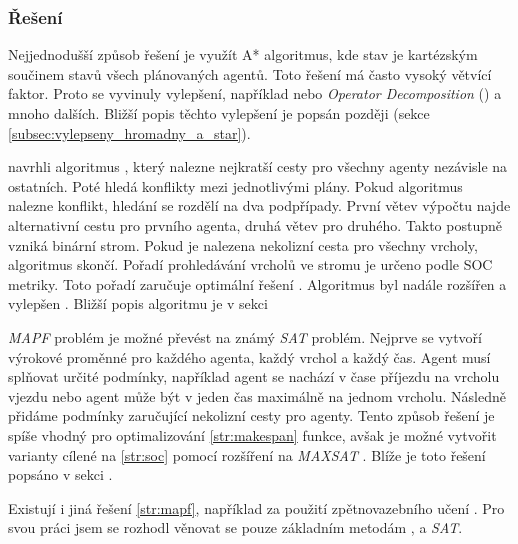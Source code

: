 \subsubsection{Řešení~}\label{subsubsec:reseni_offline_mapf}



Nejjednodušší způsob řešení je využít A* algoritmus, kde stav je kartézským součinem stavů všech plánovaných agentů.
Toto řešení má často vysoký větvící faktor.
Proto se vyvinuly vylepšení, například  nebo
\emph{Operator Decomposition} (\citep{Standley_2010}) a mnoho dalších.
Bližší popis těchto vylepšení je popsán později (sekce \ref{subsec:vylepseny_hromadny_a_star}).

\citet*{Sharon} navrhli algoritmus ,
který nalezne nejkratší cesty pro všechny agenty nezávisle na ostatních.
Poté hledá konflikty mezi jednotlivými plány.
Pokud algoritmus nalezne konflikt, hledání se rozdělí na dva podpřípady.
První větev výpočtu najde alternativní cestu pro prvního agenta, druhá větev pro druhého.
Takto postupně vzniká binární strom.
Pokud je nalezena nekolizní cesta pro všechny vrcholy, algoritmus skončí.
Pořadí prohledávání vrcholů ve stromu je určeno podle SOC metriky.
Toto pořadí zaručuje optimální řešení \citep{Sharon}.
Algoritmus byl nadále rozšířen a vylepšen \citep{Boyarski}.
Bližší popis algoritmu je v sekci 

\emph{MAPF} problém je možné převést na známý \emph{SAT} problém.  %
Nejprve se vytvoří výrokové proměnné pro každého agenta, každý vrchol a každý čas.
Agent musí splňovat určité podmínky, například agent se nachází v čase příjezdu na vrcholu vjezdu
nebo agent může být v jeden čas maximálně na jednom vrcholu.
Následně přidáme podmínky zaručující nekolizní cesty pro agenty.
Tento způsob řešení je spíše vhodný pro optimalizování \ref{str:makespan} funkce,
avšak je možné vytvořit varianty cílené na \ref{str:soc} pomocí rozšíření na \emph{MAXSAT} \citep{bartak}.
Blíže je toto řešení popsáno v sekci .

Existují i jiná řešení \ref{str:mapf}, například za použití zpětnovazebního učení \citep*{Zhiyao}.
Pro svou práci jsem se rozhodl věnovat se pouze základním metodám
,  a \emph{SAT}. %

